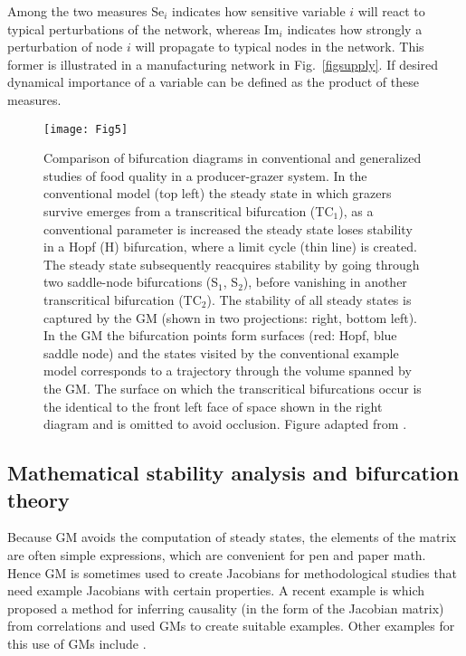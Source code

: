 \documentclass{article}
\begin{document}
Among the two measures Se$_i$ indicates how sensitive variable $i$ will react to typical perturbations of the network, whereas Im$_i$ indicates how strongly a perturbation of node $i$ will propagate to typical nodes in the network. This former is illustrated in a manufacturing network in Fig.~\ref{figsupply}. If desired dynamical importance of a variable can be defined as the product of these measures.  


\begin{figure}
    \centering
    \texttt{[image: Fig5]}
    \caption{Comparison of bifurcation diagrams in conventional and generalized studies of food quality in a producer-grazer system. In the conventional model (top left) the steady state in which grazers survive emerges from a transcritical bifurcation (TC$_1$), as a conventional parameter is increased the steady state loses stability in a Hopf (H) bifurcation, where a limit cycle (thin line) is created. The steady state subsequently reacquires stability by going through two saddle-node bifurcations (S$_1$, S$_2$), before vanishing in another transcritical bifurcation (TC$_2$). The stability of all steady states is captured by the GM (shown in two projections: right, bottom left). In the GM the bifurcation points form surfaces (red: Hopf, blue saddle node) and the states visited by the conventional example model corresponds to a trajectory through the volume spanned by the GM. The surface on which the transcritical bifurcations occur is the identical to the front left face of space shown in the right diagram and is omitted to avoid occlusion. Figure adapted from \citet{Stiefs2010AMNAT}.}
    \label{figFood}
\end{figure}

\subsection{Mathematical stability analysis and bifurcation theory}
Because GM avoids the computation of steady states, the elements of the matrix are often simple expressions, which are convenient for pen and paper math. Hence GM is sometimes used to create Jacobians for methodological studies that need example Jacobians with certain properties. A recent example is \cite{barter2021closed} which proposed a method for inferring causality (in the form of the Jacobian matrix) from correlations and used GMs to create suitable examples. Other examples for this use of GMs include \cite{Hoefener2011EPL,Hoefener2012PTRS,Do2012NJP}.
\end{document}

